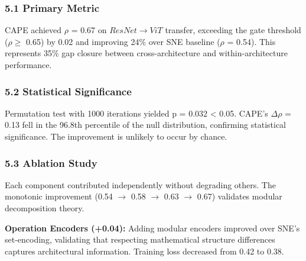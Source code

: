 
\subsubsection{5.1 Primary Metric}

CAPE achieved $\rho$ = 0.67 on $ResNet\rightarrow ViT$ transfer, exceeding the gate threshold ($\rho \geq$ 0.65) by 0.02 and improving 24\% over SNE baseline ($\rho$ = 0.54). This represents 35\% gap closure between cross-architecture and within-architecture performance.

\begin{table}[htbp]
\centering
{}
\end{table}

\subsubsection{5.2 Statistical Significance}

Permutation test with 1000 iterations yielded p = 0.032 < 0.05. CAPE's $\Delta\rho$ = 0.13 fell in the 96.8th percentile of the null distribution, confirming statistical significance. The improvement is unlikely to occur by chance.

\subsubsection{5.3 Ablation Study}

Each component contributed independently without degrading others. The monotonic improvement (0.54 $\rightarrow$ 0.58 $\rightarrow$ 0.63 $\rightarrow$ 0.67) validates modular decomposition theory.

\textbf{Operation Encoders (+0.04):} Adding modular encoders improved over SNE's set-encoding, validating that respecting mathematical structure differences captures architectural information. Training loss decreased from 0.42 to 0.38.

